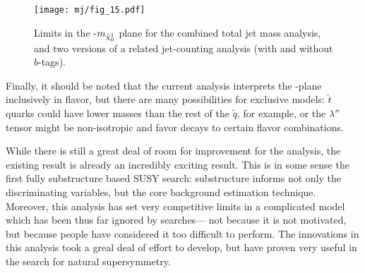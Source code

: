 
\begin{figure}
\centering
\texttt{[image: mj/fig\_15.pdf]}
\caption{Limits in the \mgluino-$m_{\tilde{\chi}_0^1}$ plane for the combined total jet mass analysis, and two versions of a related jet-counting analysis (with and without $b$-tags).}
\label{fig:search:limits:compare}
\end{figure}


Finally, it should be noted that the current analysis interprets the \gluino-\lsp plane inclusively in flavor, but there are many possibilities for exclusive models: $\tilde{t}$ quarks could have lower masses than the rest of the $\tilde{q}$, for example, or the $\lambda''$ tensor might be non-isotropic and favor decays to certain flavor combinations.

While there is still a great deal of room for improvement for the analysis, the existing result is already an incredibly exciting result. This is in some sense the first fully substructure based SUSY search: substructure informs not only the discriminating variables, but the core background estimation technique. Moreover, this analysis has set very competitive limits in a complicated model which has been thus far ignored by searches--- not because it is not motivated, but because people have considered it too difficult to perform. The innovations in this analysis took a greal deal of effort to develop, but have proven very useful in the search for natural supersymmetry.





